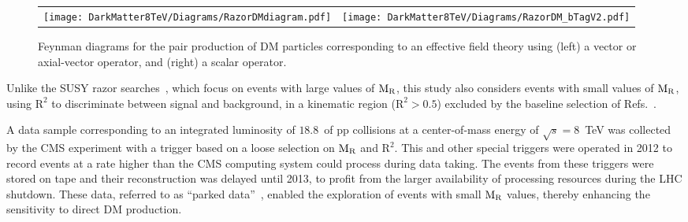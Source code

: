 {{\begin{figure}[h!]
 \centering
 \begin{tabular}{cc}
    \hspace{-1cm}\texttt{[image: DarkMatter8TeV/Diagrams/RazorDMdiagram.pdf]}  & 
   \hspace{1cm}\texttt{[image: DarkMatter8TeV/Diagrams/RazorDM\_bTagV2.pdf]}
  \end{tabular}
 \caption{Feynman diagrams for the pair production of DM particles
   corresponding to an effective field theory using (left) a vector or
   axial-vector operator, and (right) a scalar operator.\label{fig:DMdiamgrams}}
\end{figure}


Unlike the SUSY razor searches~\cite{Razor8TeV,razor2010}, which focus on events with large
values of $\mathrm{M_{\rm R}}$, this study also considers events with small values
of $\mathrm{M_{\rm R}}$, using $\mathrm{R^2}$ to discriminate
between signal and background, in a kinematic region ($\mathrm{R^2} >
0.5$) excluded by the baseline selection of Refs.~\cite{Razor8TeV,razor2010}.

A data sample corresponding to an integrated luminosity of
$18.8$~\fbinv of pp collisions at a center-of-mass energy of
$\sqrt{s}=8$~TeV  was collected by the CMS experiment %
 with a trigger based on a
loose selection on $\mathrm{M_{\rm R}}$ and $\mathrm{R^2}$. This and other
special triggers were operated in 2012 to record events at a rate
higher than the CMS computing system could process during data
taking. The events from these triggers were stored on tape and their
reconstruction was delayed until 2013, to profit from the larger availability of processing resources during the LHC shutdown. 
These data, referred to as ``parked data''~\cite{CMS-DP-2012-022},
enabled the exploration of events with small $\mathrm{M_{\rm R}}$
values, thereby enhancing the sensitivity to direct DM production.
 
}}
